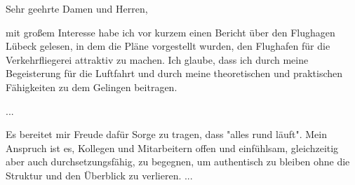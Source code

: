 \documentclass[12pt,a4paper]{article}
\begin{document}
Sehr geehrte Damen und Herren,

mit großem Interesse habe ich vor kurzem einen Bericht über den Flughagen Lübeck gelesen, in dem die Pläne vorgestellt wurden, den Flughafen für die Verkehrfliegerei attraktiv zu machen. Ich glaube, dass ich durch meine Begeisterung für die Luftfahrt und durch meine theoretischen und praktischen Fähigkeiten 
zu dem Gelingen beitragen.

...

Es bereitet mir Freude dafür Sorge zu tragen, dass "alles rund läuft". Mein Anspruch ist es, Kollegen und Mitarbeitern  offen und einfühlsam, gleichzeitig aber auch durchsetzungsfähig, zu begegnen, um authentisch zu bleiben ohne die Struktur und den Überblick zu verlieren. ...
\end{document}
